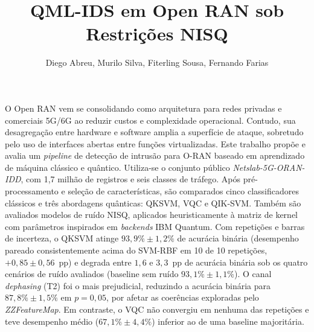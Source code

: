\documentclass[12pt]{article}
\title{QML-IDS em Open RAN sob Restrições NISQ}
\author{Diego Abreu\inst{1}, Murilo Silva\inst{1}, Fiterling Sousa\inst{1},  Fernando Farias\inst{1}}
\begin{document}
\maketitle

\begin{resumo}
O Open RAN vem se consolidando como arquitetura para redes privadas e comerciais 5G/6G ao reduzir custos e complexidade operacional. Contudo, sua desagregação entre hardware e software amplia a superfície de ataque, sobretudo pelo uso de interfaces abertas entre funções virtualizadas. Este trabalho propõe e avalia um \textit{pipeline} de detecção de intrusão para O-RAN baseado em aprendizado de máquina clássico e quântico. Utiliza-se o conjunto público \textit{Netslab-5G-ORAN-IDD}, com 1,7 milhão de registros e seis classes de tráfego. Após pré-processamento e seleção de características, são comparados cinco classificadores clássicos e três abordagens quânticas: QKSVM, VQC e QIK-SVM. Também são avaliados modelos de ruído NISQ, aplicados heuristicamente à matriz de kernel com parâmetros inspirados em \textit{backends} IBM Quantum. Com repetições e barras de incerteza, o QKSVM atinge $93{,}9\% \pm 1{,}2\%$ de acurácia binária (desempenho pareado consistentemente acima do SVM-RBF em 10 de 10 repetições, $+0{,}85 \pm 0{,}56$~pp) e degrada entre $1{,}6$ e $3{,}3$~pp de acurácia binária sob os quatro cenários de ruído avaliados (baseline sem ruído $93{,}1\% \pm 1{,}1\%$). O canal \textit{dephasing} (T2) foi o mais prejudicial, reduzindo a acurácia binária para $87{,}8\% \pm 1{,}5\%$ em $p=0{,}05$, por afetar as coerências exploradas pelo \textit{ZZFeatureMap}. Em contraste, o VQC não convergiu em nenhuma das repetições e teve desempenho médio ($67{,}1\% \pm 4{,}4\%$) inferior ao de uma baseline majoritária.
\end{resumo}

\end{document}
